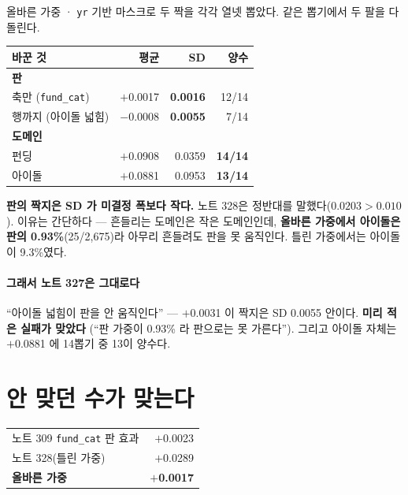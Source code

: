 \documentclass[10pt]{article}
\begin{document}
올바른 가중 · \texttt{yr} 기반 마스크로 두 짝을 각각 열넷 뽑았다. 같은
뽑기에서 두 팔을 다 돌린다.

\begin{center}\footnotesize
\begin{tabular}{lrrr}
\hline
바꾼 것 & 평균 & SD & 양수 \\
\hline
\multicolumn{4}{l}{\textbf{판}} \\
\quad 축만 (\texttt{fund\_cat}) & $+$0.0017 & \textbf{0.0016} & 12/14 \\
\quad 행까지 (아이돌 넓힘) & $-$0.0008 & \textbf{0.0055} & 7/14 \\
\multicolumn{4}{l}{\textbf{도메인}} \\
\quad 펀딩 & $+$0.0908 & 0.0359 & \textbf{14/14} \\
\quad 아이돌 & $+$0.0881 & 0.0953 & \textbf{13/14} \\
\hline
\end{tabular}
\end{center}

\textbf{판의 짝지은 SD 가 미결정 폭보다 작다.} 노트 328은 정반대를
말했다($0.0203 > 0.010$). 이유는 간단하다 --- 흔들리는 도메인은 작은
도메인인데, \textbf{올바른 가중에서 아이돌은 판의 0.93\%}(25/2,675)라
아무리 흔들려도 판을 못 움직인다. 틀린 가중에서는 아이돌이 9.3\%였다.

\paragraph{그래서 노트 327은 그대로다} ``아이돌 넓힘이 판을 안 움직인다''
--- $+$0.0031 이 짝지은 SD 0.0055 안이다. \textbf{미리 적은 실패가 맞았다}
(``판 가중이 0.93\% 라 판으로는 못 가른다''). 그리고 아이돌 자체는
$+$0.0881 에 14뽑기 중 13이 양수다.

\section{안 맞던 수가 맞는다}

\begin{center}\small
\begin{tabular}{lr}
\hline
노트 309 \texttt{fund\_cat} 판 효과 & $+$0.0023 \\
노트 328(틀린 가중) & $+$0.0289 \\
\textbf{올바른 가중} & \textbf{$+$0.0017} \\
\hline
\end{tabular}
\end{center}
\end{document}
